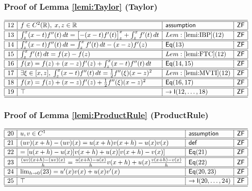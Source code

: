 \documentclass[11pt,reqno]{amsart}
\begin{document}
\medskip

\subsubsection*{Proof of Lemma \ref{lemi:Taylor} (\textsf{Taylor})}

\noindent$%
\begin{array}{|r|l|l|l|}
\hline\hline
12 & f\in C^{2}(\mathbb{R}),\;x,z\in\mathbb{R} & \mathsf{assumption} & \mathsf{ZF} \\ \hline\hline
13 & \int_{z}^{x}(x-t)f^{\prime\prime}(t)\,dt=\bigl[-(x-t)f^{\prime}(t)\bigr]_{z}^{x}+\int_{z}^{x}f^{\prime}(t)\,dt & Lem:\ref{lemi:IBP}(12) & \mathsf{ZF} \\ \hline\hline
14 & \int_{z}^{x}(x-t)f^{\prime\prime}(t)\,dt=\int_{z}^{x}f^{\prime}(t)\,dt-(x-z)f^{\prime}(z) & \mathsf{Eq}(13) & \mathsf{ZF} \\ \hline\hline
15 & \int_{z}^{x}f^{\prime}(t)\,dt=f(x)-f(z) & Lem:\ref{lemi:FTC}(12) & \mathsf{ZF} \\ \hline\hline
16 & f(x)=f(z)+(x-z)f^{\prime}(z)+\int_{z}^{x}(x-t)f^{\prime\prime}(t)\,dt & \mathsf{Eq}(14,15) & \mathsf{ZF} \\ \hline\hline
17 & \exists\xi\in[x,z],\;\int_{z}^{x}(x-t)f^{\prime\prime}(t)\,dt=\tfrac12 f^{\prime\prime}(\xi)(x-z)^{2} & Lem:\ref{lemi:MVTI}(12) & \mathsf{ZF} \\ \hline\hline
18 & f(x)=f(z)+(x-z)f^{\prime}(z)+\tfrac12 f^{\prime\prime}(\xi)(x-z)^{2} & \mathsf{Eq}(16,17) & \mathsf{ZF} \\ \hline\hline
19 & \top & \to\mathsf{I}(12,\dots,18) & \mathsf{ZF} \\ \hline\hline
\end{array}%
$

\medskip

\subsubsection*{Proof of Lemma \ref{lemi:ProductRule} (\textsf{ProductRule})}

\noindent$%
\begin{array}{|r|l|l|l|}
\hline\hline
20 & u,v\in C^{1} & \mathsf{assumption} & \mathsf{ZF} \\ \hline\hline
21 & (uv)(x+h)-(uv)(x)=u(x+h)v(x+h)-u(x)v(x) & \mathsf{def} & \mathsf{ZF} \\ \hline\hline
22 & =[u(x+h)-u(x)]v(x+h)+u(x)[v(x+h)-v(x)] & \mathsf{Eq}(21) & \mathsf{ZF} \\ \hline\hline
23 & \frac{(uv)(x+h)-(uv)(x)}{h}=\frac{u(x+h)-u(x)}{h}v(x+h)+u(x)\frac{v(x+h)-v(x)}{h} & \mathsf{Eq}(22) & \mathsf{ZF} \\ \hline\hline
24 & \lim_{h\to0}(23)=u^{\prime}(x)v(x)+u(x)v^{\prime}(x) & \mathsf{Eq}(20,23) & \mathsf{ZF} \\ \hline\hline
25 & \top & \to\mathsf{I}(20,\dots,24) & \mathsf{ZF} \\ \hline\hline
\end{array}%
$
\end{document}

